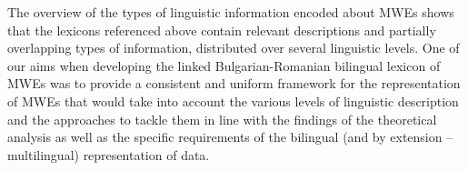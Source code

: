 \documentclass[output=paper,colorlinks,citecolor=brown]{langscibook}
\begin{document}

The overview of the types of linguistic information encoded about MWEs shows that the lexicons referenced above contain relevant descriptions and partially overlapping types of information, distributed over several linguistic levels. One of our aims when developing the linked Bulgarian-Romanian %
bilingual lexicon of MWEs %
was to provide a consistent and uniform framework for the representation of MWEs that would take into account the various levels of linguistic description and the approaches to tackle them in line with the findings of the theoretical analysis as well as the specific requirements of the bilingual (and by extension -- multilingual) representation of data.
\end{document}
